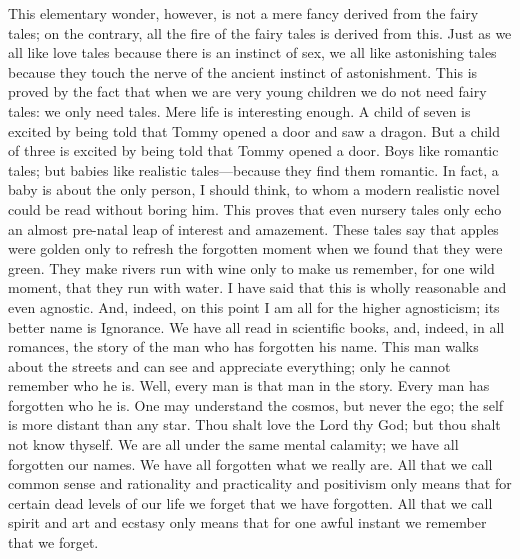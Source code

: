 \documentclass{book}
\begin{document}
This elementary wonder, however, is not a mere fancy derived from the fairy tales; on the contrary, all the fire of the fairy tales is derived from this. Just as we all like love tales because there is an instinct of sex, we all like astonishing tales because they touch the nerve of the ancient instinct of astonishment. This is proved by the fact that when we are very young children we do not need fairy tales: we only need tales. Mere life is interesting enough. A child of seven is excited by being told that Tommy opened a door and saw a dragon. But a child of three is excited by being told that Tommy opened a door. Boys like romantic tales; but babies like realistic tales—because they find them romantic. In fact, a baby is about the only person, I should think, to whom a modern realistic novel could be read without boring him. This proves that even nursery tales only echo an almost pre-natal leap of interest and amazement. These tales say that apples were golden only to refresh the forgotten moment when we found that they were green. They make rivers run with wine only to make us remember, for one wild moment, that they run with water. I have said that this is wholly reasonable and even agnostic. And, indeed, on this point I am all for the higher agnosticism; its better name is Ignorance. We have all read in scientific books, and, indeed, in all romances, the story of the man who has forgotten his name. This man walks about the streets and can see and appreciate everything; only he cannot remember who he is. Well, every man is that man in the story. Every man has forgotten who he is. One may understand the cosmos, but never the ego; the self is more distant than any star. Thou shalt love the Lord thy God; but thou shalt not know thyself. We are all under the same mental calamity; we have all forgotten our names. We have all forgotten what we really are. All that we call common sense and rationality and practicality and positivism only means that for certain dead levels of our life we forget that we have forgotten. All that we call spirit and art and ecstasy only means that for one awful instant we remember that we forget.
\end{document}
